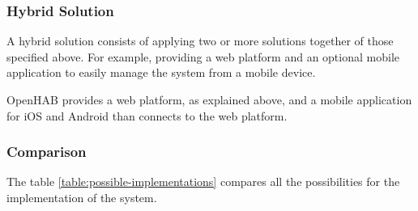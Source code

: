\subsubsection{Hybrid Solution}
A hybrid solution consists of applying two or more solutions together of those specified above. For example, providing a web platform
and an optional mobile application to easily manage the system from a mobile device.

OpenHAB provides a web platform, as explained above, and a mobile application for iOS and Android than connects to the web platform.

\subsubsection{Comparison}
The table \ref{table:possible-implementations} compares all the possibilities for the implementation of the system.

